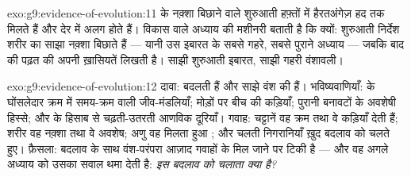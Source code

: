 \begin{solution}{exo:g9:evidence-of-evolution:11}
 के  नक़्शा बिछाने वाले शुरुआती हफ़्तों में हैरतअंगेज़ हद
तक मिलते हैं और देर में अलग होते हैं। विकास वाले अध्याय की मशीनरी बताती है
कि क्यों: शुरुआती निर्देश शरीर का साझा नक़्शा बिछाते हैं --- यानी उस
इबारत के सबसे गहरे, सबसे पुराने अध्याय --- जबकि बाद की पढ़त  की
अपनी ख़ासियतें लिखती है। साझी शुरुआती इबारत, साझी गहरी वंशावली।
\end{solution}

\begin{solution}{exo:g9:evidence-of-evolution:12}
दावा:  बदलती हैं और साझे वंश की हैं। भविष्यवाणियाँ:  के
घोंसलेदार क्रम में समय-क्रम वाली जीव-मंडलियाँ; मोड़ों पर बीच की कड़ियाँ;
पुरानी बनावटों के अवशेषी हिस्से; और  के हिसाब से चढ़ती-उतरती
आणविक दूरियाँ। गवाह: चट्टानें वह क्रम तथा वे कड़ियाँ देती हैं; शरीर वह
नक़्शा तथा वे अवशेष; अणु वह मिलता हुआ ; और चलती निगरानियाँ ख़ुद
बदलाव को चलते हुए। फ़ैसला: बदलाव के साथ वंश-परंपरा आज़ाद गवाहों के मिल
जाने पर टिकी है --- और वह अगले अध्याय को उसका सवाल थमा देती है:
\emph{इस बदलाव को चलाता क्या है?}
\end{solution}

